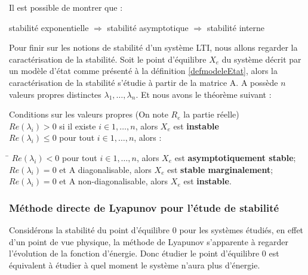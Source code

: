\begin{rem}
	\label{remImplique}
	Il est possible de montrer que :
	\begin{center}
		stabilité exponentielle $\Rightarrow$ stabilité asymptotique $\Rightarrow$ stabilité interne
	\end{center}
\end{rem}

Pour finir sur les notions de stabilité d'un système LTI, nous allons regarder la caractérisation de la stabilité. Soit le point d'équilibre $X_e$ du système décrit par un modèle d'état comme présenté à la définition \ref{defmodeleEtat}, alors la caractérisation de la stabilité s'étudie à partir de la matrice A. A possède $n$ valeurs propres distinctes $\lambda_1,\ldots,\lambda_n$. Et nous avons le théorème suivant : 
\begin{theo} Conditions sur les valeurs propres (On note $R_e$ la partie réelle)\\
	$Re(\lambda_i) > 0$ si il existe $i \in 1,\ldots,n$, alors $X_e$ est \textbf{instable}\\
	$Re(\lambda_i) \leq 0$ pour tout $i \in 1,\ldots,n$, alors :\\
	\vspace{-1cm}
	\begin{tabbing}
		\hspace{1cm}\=\kill
		\> $Re(\lambda_i) < 0$ pour tout $i \in 1,\ldots,n$, alors $X_e$ est \textbf{asymptotiquement stable};\\ 
		\> $Re(\lambda_i) = 0$ et A diagonalisable, alors $X_e$ est \textbf{stable marginalement};\\ 
		\> $Re(\lambda_i) = 0$ et A non-diagonalisable, alors $X_e$ est \textbf{instable}.
	\end{tabbing} 
\end{theo}

\subsubsection{Méthode directe de Lyapunov pour l'étude de stabilité}
Considérons la stabilité du point d'équilibre 0 pour les systèmes étudiés, en effet d'un point de vue physique, la méthode de Lyapunov s'apparente à regarder l'évolution de la fonction d'énergie. Donc étudier le point d'équilibre 0 est équivalent à étudier à quel moment le système n'aura plus d'énergie. 

